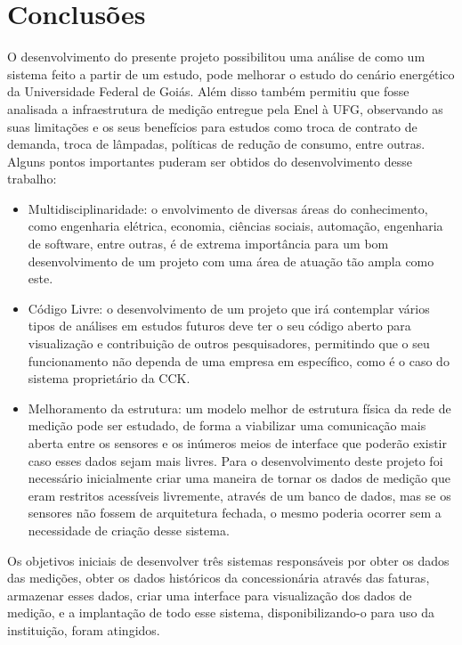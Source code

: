 \chapter{Conclusões}
\label{c:conclusoes}

O desenvolvimento do presente projeto possibilitou uma análise de como um sistema feito a partir de um estudo, pode melhorar o estudo do cenário energético da Universidade Federal de Goiás. Além disso também permitiu que fosse analisada a infraestrutura de medição entregue pela Enel à UFG, observando as suas limitações e os seus benefícios para estudos como troca de contrato de demanda, troca de lâmpadas, políticas de redução de consumo, entre outras. Alguns pontos importantes puderam ser obtidos do desenvolvimento desse trabalho:

\begin{itemize}
    \item Multidisciplinaridade: o envolvimento de diversas áreas do conhecimento, como engenharia elétrica, economia, ciências sociais, automação, engenharia de software, entre outras, é de extrema importância para um bom desenvolvimento de um projeto com uma área de atuação tão ampla como este.
    \item Código Livre: o desenvolvimento de um projeto que irá contemplar vários tipos de análises em estudos futuros deve ter o seu código aberto para visualização e contribuição de outros pesquisadores, permitindo que o seu funcionamento não dependa de uma empresa em específico, como é o caso do sistema proprietário da CCK.
    \item Melhoramento da estrutura: um modelo melhor de estrutura física da rede de medição pode ser estudado, de forma a viabilizar uma comunicação mais aberta entre os sensores e os inúmeros meios de interface que poderão existir caso esses dados sejam mais livres. Para o desenvolvimento deste projeto foi necessário inicialmente criar uma maneira de tornar os dados de medição que eram restritos acessíveis livremente, através de um banco de dados, mas se os sensores não fossem de arquitetura fechada, o mesmo poderia ocorrer sem a necessidade de criação desse sistema.
\end{itemize}

Os objetivos iniciais de desenvolver três sistemas responsáveis por obter os dados das medições, obter os dados históricos da concessionária através das faturas, armazenar esses dados, criar uma interface para visualização dos dados de medição, e a implantação de todo esse sistema, disponibilizando-o para uso da instituição, foram atingidos.